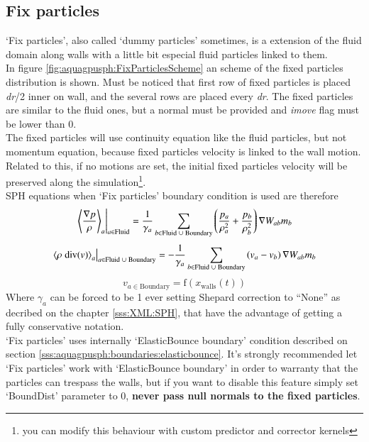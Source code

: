 \subsection{Fix particles}
\label{sss:aquagpusph:boundaries:fixparticles}
%
`Fix particles', also called `dummy particles' sometimes, is a extension of the fluid domain along walls with a little
bit especial fluid particles linked to them.\\
%
In figure \ref{fig:aquagpusph:FixParticlesScheme} an scheme of the fixed particles distribution is shown. Must be
noticed that first row of fixed particles is placed \textit{dr}/2 inner on wall, and the several rows are placed
every \textit{dr}. The fixed particles are similar to the fluid ones, but a normal must be provided and
\textit{imove} flag must be lower than 0.\\
%
The fixed particles will use continuity equation like the fluid particles, but not momentum equation, because
fixed particles velocity is linked to the wall motion. Related to this, if no motions are set, the initial fixed
particles velocity will be preserved along the simulation\footnote{you can modify this behaviour with custom
predictor and corrector kernels}.\\
%
SPH equations when `Fix particles' boundary condition is used are therefore
%
\[
\left. \left\langle \frac{\nabla p}{\rho} \right\rangle_a \right\vert_{a \in \mathrm{Fluid}} = \frac{1}{\gamma_a}
	\sum\limits_{b \in \mathrm{Fluid}\;\cup\;\mathrm{Boundary}} 
		\left( \frac{p_a}{\rho_a^2} + \frac{p_b}{\rho_b^2} \right)
	\nabla W_{ab} m_b
\]
%
\[
\left. \left\langle \rho \; \mbox{div}(v) \right\rangle_a \right\vert_{a \in \mathrm{Fluid}\;\cup\;\mathrm{Boundary}} =
	- \frac{1}{\gamma_a}
	\sum\limits_{b \in \mathrm{Fluid}\;\cup\;\mathrm{Boundary}} 
		\left( v_a - v_b \right)
	\nabla W_{ab} m_b
\]
%
\[
v_{a \in \mathrm{Boundary}} = \mathrm{f}\left(x_\mathrm{walls} \left( t \right) \right)
\]
%
Where $\gamma_a$ can be forced to be 1 ever setting Shepard correction to ``None'' as decribed on the chapter
\ref{sss:XML:SPH}, that have the advantage of getting a fully conservative notation.\\
%
`Fix particles' uses internally `ElasticBounce boundary' condition described on section
\ref{sss:aquagpusph:boundaries:elasticbounce}. It's strongly recommended let `Fix particles' work with
`ElasticBounce boundary' in order to warranty that the particles can trespass the walls, but if you want to
disable this feature simply set `BoundDist' parameter to 0, \textbf{never pass null normals to the fixed
particles}.\\
